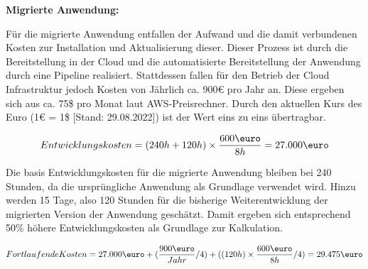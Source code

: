 



\textbf{Migrierte Anwendung:}

Für die migrierte Anwendung entfallen der Aufwand und die damit verbundenen Kosten zur Installation und Aktualisierung dieser. Dieser Prozess ist durch die Bereitstellung in der Cloud und die automatisierte Bereitstellung der Anwendung durch eine Pipeline realisiert. Stattdessen fallen für den Betrieb der Cloud Infrastruktur jedoch Kosten von Jährlich ca. 900€ pro Jahr an. Diese ergeben sich aus ca. 75\$ pro Monat laut \ac{AWS}-Preisrechner. Durch den aktuellen Kurs des Euro (1€ = 1\$ [Stand: 29.08.2022]) ist der Wert eins zu eins übertragbar.

\begin{align}
    Entwicklungskosten = (240h + 120h) \times \frac{600\mbox{\euro}}{8h} = 27.000\mbox{\euro}
\end{align}

Die basis Entwicklungskosten für die migrierte Anwendung bleiben bei 240 Stunden, da die ursprüngliche Anwendung als Grundlage verwendet wird. Hinzu werden 15 Tage, also 120 Stunden für die bisherige Weiterentwicklung der migrierten Version der Anwendung
geschätzt. Damit ergeben sich entsprechend 50\% höhere Entwicklungskosten als Grundlage zur Kalkulation.

\begin{align}
    Fortlaufende Kosten = 27.000\mbox{\euro} + (\frac{900\mbox{\euro}}{Jahr}/4) + ((120h) \times \frac{600\mbox{\euro}}{8h}/4) = 29.475\mbox{\euro}
\end{align}

